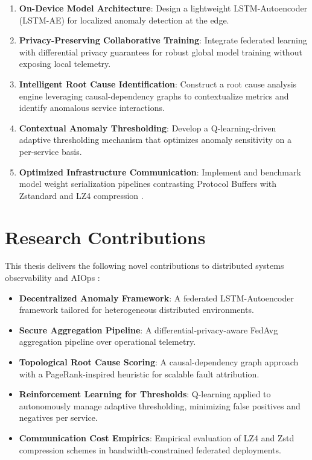 \begin{enumerate}
    \item \textbf{On-Device Model Architecture}: Design a lightweight LSTM-Autoencoder
    (LSTM-AE) \cite{malhotra2015lstm} for localized anomaly detection at the edge.

    \item \textbf{Privacy-Preserving Collaborative Training}: Integrate federated
    learning \cite{mcmahan2017communication} with differential privacy guarantees
    \cite{dwork2006differential, abadi2016deep} for robust global model training
    without exposing local telemetry.

    \item \textbf{Intelligent Root Cause Identification}: Construct a root cause
    analysis engine leveraging causal-dependency graphs to contextualize metrics and
    identify anomalous service interactions.

    \item \textbf{Contextual Anomaly Thresholding}: Develop a Q-learning-driven
    \cite{watkins1992qlearning} adaptive thresholding mechanism that optimizes
    anomaly sensitivity on a per-service basis.

    \item \textbf{Optimized Infrastructure Communication}: Implement and benchmark
    model weight serialization pipelines contrasting Protocol Buffers with Zstandard
    and LZ4 compression \cite{collet2018zstandard, lz4_reference}.
\end{enumerate}

\section{Research Contributions}
\label{sec:contributions}

This thesis delivers the following novel contributions to distributed systems
observability and AIOps \cite{lin2018aiops}:

\begin{itemize}
    \item \textbf{Decentralized Anomaly Framework}: A federated LSTM-Autoencoder
    framework tailored for heterogeneous distributed environments.

    \item \textbf{Secure Aggregation Pipeline}: A differential-privacy-aware FedAvg
    \cite{mcmahan2017communication} aggregation pipeline over operational telemetry.

    \item \textbf{Topological Root Cause Scoring}: A causal-dependency graph approach
    with a PageRank-inspired heuristic \cite{page1999pagerank} for scalable fault
    attribution.

    \item \textbf{Reinforcement Learning for Thresholds}: Q-learning applied to
    autonomously manage adaptive thresholding, minimizing false positives and
    negatives per service.

    \item \textbf{Communication Cost Empirics}: Empirical evaluation of LZ4 and Zstd
    compression schemes in bandwidth-constrained federated deployments.
\end{itemize}

